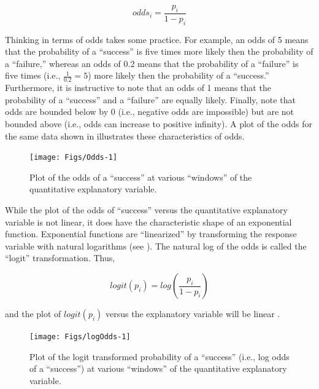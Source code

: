 \documentclass[10pt,openany]{book}\usepackage[]{graphicx}\usepackage[]{color}
\newenvironment{knitrout}{}{} %
\begin{document}
\[ odds_{i} = \frac{p_{i}}{1-p_{i}} \]

Thinking in terms of odds takes some practice.  For example, an odds of 5 means that the probability of a ``success'' is five times more likely then the probability of a ``failure,'' whereas an odds of 0.2 means that the probability of a ``failure'' is five times (i.e., $\frac{1}{0.2}$$=5$) more likely then the probability of a ``success.''  Furthermore, it is instructive to note that an odds of 1 means that the probability of a ``success'' and a ``failure'' are equally likely.  Finally, note that odds are bounded below by 0 (i.e., negative odds are impossible) but are not bounded above (i.e., odds can increase to positive infinity).  A plot of the odds for the same data shown in  illustrates these characteristics of odds.

\begin{knitrout}
\color{fgcolor}\begin{figure}[hbtp]

{\centering \texttt{[image: Figs/Odds-1]} 

}

\caption[Plot of the odds of a ``success'' at various ``windows'' of the quantitative explanatory variable]{Plot of the odds of a ``success'' at various ``windows'' of the quantitative explanatory variable.}\label{fig:Odds}
\end{figure}


\end{knitrout}
\vspace{9pt}
While the plot of the odds of ``success'' versus the quantitative explanatory variable is not linear, it does have the characteristic shape of an exponential function.  Exponential functions are ``linearized'' by transforming the response variable with natural logarithms (see ).  The natural log of the odds is called the ``logit'' transformation.  Thus,

\[ logit(p_{i}) = log\left(\frac{p_{i}}{1-p_{i}}\right) \]

and the plot of $logit(p_{i})$ versus the explanatory variable will be linear .

\begin{knitrout}
\color{fgcolor}\begin{figure}[hbtp]

{\centering \texttt{[image: Figs/logOdds-1]} 

}

\caption[Plot of the logit transformed probability of a ``success'' (i]{Plot of the logit transformed probability of a ``success'' (i.e., log odds of a ``success'') at various ``windows'' of the quantitative explanatory variable.}\label{fig:logOdds}
\end{figure}


\end{knitrout}
\end{document}
